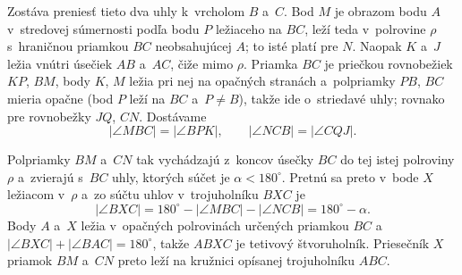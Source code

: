 {    Zostáva preniesť tieto dva uhly k~vrcholom $B$ a~$C$. Bod $M$ je obrazom bodu $A$ v~stredovej súmernosti podľa bodu $P$ ležiaceho na $BC$, leží teda v~polrovine $\rho$ s~hraničnou priamkou $BC$ neobsahujúcej $A$; to isté platí pre $N$. Naopak $K$ a~$J$ ležia vnútri úsečiek $AB$ a~$AC$, čiže mimo $\rho$. Priamka $BC$ je priečkou rovnobežiek $KP$, $BM$, body $K$, $M$ ležia pri nej na opačných stranách a~polpriamky $PB$, $BC$ mieria opačne (bod $P$ leží na $BC$ a~$P \neq B$), takže ide o~striedavé uhly; rovnako pre rovnobežky $JQ$, $CN$. Dostávame
    $$
    |\angle MBC| = |\angle BPK|, \qquad |\angle NCB| = |\angle CQJ|.
    $$

    Polpriamky $BM$ a~$CN$ tak vychádzajú z~koncov úsečky $BC$ do tej istej polroviny $\rho$ a~zvierajú s~$BC$ uhly, ktorých súčet je $\alpha < 180^\circ$. Pretnú sa preto v~bode $X$ ležiacom v~$\rho$ a~zo súčtu uhlov v~trojuholníku $BXC$ je
    $$
    |\angle BXC| = 180^\circ - |\angle MBC| - |\angle NCB| = 180^\circ - \alpha.
    $$
    Body $A$ a~$X$ ležia v~opačných polrovinách určených priamkou $BC$ a~$|\angle BXC| + |\angle BAC| = 180^\circ$, takže $ABXC$ je tetivový štvoruholník. Priesečník $X$ priamok $BM$ a~$CN$ preto leží na kružnici opísanej trojuholníku $ABC$.
}

